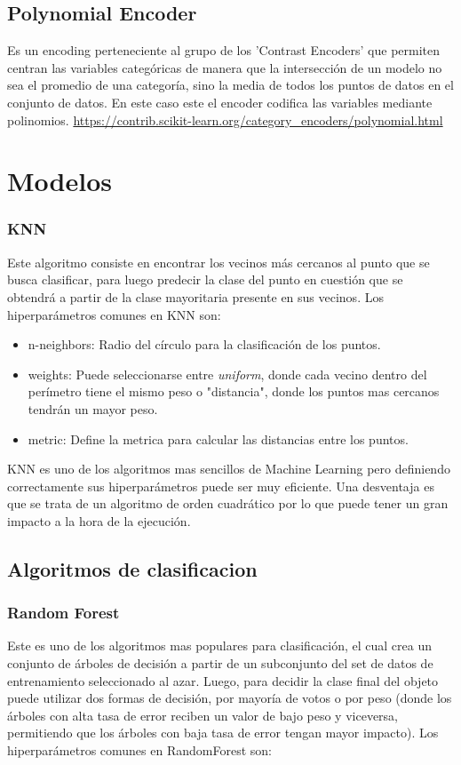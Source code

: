 \documentclass[12pt,a4paper]{article}
\begin{document}
\subsection{Polynomial Encoder}
Es un encoding perteneciente al grupo de los 'Contrast Encoders' que permiten centran las variables categóricas de manera que la intersección de un modelo no sea el promedio de una categoría, sino la media de todos los puntos de datos en el conjunto de datos.
En este caso este el encoder codifica las variables mediante polinomios. 
\url{https://contrib.scikit-learn.org/category_encoders/polynomial.html}
\newpage
\section{Modelos}
\subsubsection{KNN}
Este algoritmo consiste en encontrar los vecinos más cercanos al punto que se busca clasificar, para luego predecir la clase del punto en cuestión que se obtendrá a partir de la clase mayoritaria presente en sus vecinos.
Los hiperparámetros comunes en KNN son:
\begin{itemize}
    \item n-neighbors: Radio del círculo para la clasificación de los puntos.
    
    \item weights: Puede seleccionarse entre \textit{uniform}, donde cada vecino dentro del perímetro tiene el mismo peso o "distancia", donde los puntos mas cercanos tendrán un mayor peso.
    
    \item metric: Define la metrica para calcular las distancias entre los puntos.
    
\end{itemize}
KNN es uno de los algoritmos mas sencillos de Machine Learning pero definiendo correctamente sus hiperparámetros puede ser muy eficiente. Una desventaja es que se trata de un algoritmo de orden cuadrático por lo que puede tener un gran impacto a la hora de la ejecución.

\subsection{Algoritmos de clasificacion}

\subsubsection{Random Forest}
Este es uno de los algoritmos mas populares para clasificación, el cual crea un conjunto de árboles de decisión a partir de un subconjunto del set de datos de entrenamiento seleccionado al azar. 
Luego, para decidir la clase final del objeto puede utilizar dos formas de decisión, por mayoría de votos o por peso (donde los árboles con alta tasa de error reciben un valor de bajo peso y viceversa, permitiendo que los árboles con baja tasa de error tengan mayor impacto).
Los hiperparámetros comunes en RandomForest son:
\end{document}
